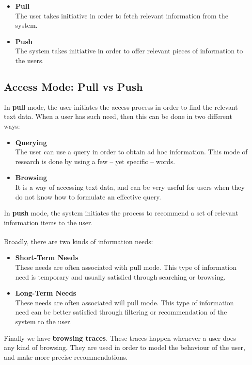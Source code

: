 \documentclass{article}
\begin{document}
\begin{itemize}
	\item \textbf{Pull}
	\vspace{.2cm} \\
	The user takes initiative in order to fetch relevant information from the system.
	
	\item \textbf{Push}
	\vspace{.2cm} \\
	The system takes initiative in order to offer relevant pieces of information to the users.
\end{itemize}

\subsection{Access Mode: Pull vs Push}
In \textbf{pull} mode, the user initiates the access process in order to find the relevant text data. When a user has such need, then this can be done in two different ways:

\begin{itemize}
	\item \textbf{Querying}
	\vspace{.2cm} \\
	The user can use a query in order to obtain ad hoc information. This mode of research is done by using a few -- yet specific -- words.
	
	\item \textbf{Browsing}
	\vspace{.2cm} \\
	It is a way of accessing text data, and can be very useful for users when they do not know how to formulate an effective query.
\end{itemize}
In \textbf{push} mode, the system initiates the process to recommend a set of relevant information items to the user. \\ \\
Broadly, there are two kinds of information needs:

\begin{itemize}
	\item \textbf{Short-Term Needs}
	\vspace{.2cm} \\
	These needs are often associated with pull mode. This type of information need is temporary and usually satisfied through searching or browsing.
	
	\item \textbf{Long-Term Needs}
	\vspace{.2cm} \\
	These needs are often associated will pull mode. This type of information need can be better satisfied through filtering or recommendation of the system to the user.
\end{itemize}
Finally we have \textbf{browsing traces}. These traces happen whenever a user does any kind of browsing. They are used in order to model the behaviour of the user, and make more precise recommendations.
\end{document}
